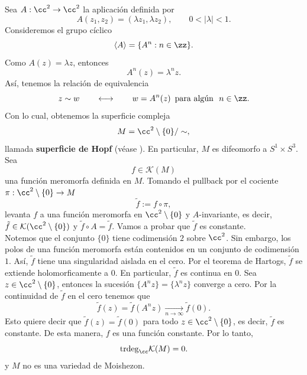 \begin{example}\label{hopfsuperficie}
	Sea $A:\cc^2\to\cc^2$ la aplicación definida por
	\begin{equation*}
		A(z_1,z_2)=(\lambda z_1,\lambda z_2),\qquad 0<|\lambda|<1.
	\end{equation*}
	Consideremos el grupo cíclico
	\begin{equation*}
		\langle A\rangle=\{A^n:n\in\zz\}.
	\end{equation*}
	Como $A(z)=\lambda z$, entonces
	\begin{equation*}
		A^n(z)=\lambda^n z.
	\end{equation*}
	Así, tenemos la relación de equivalencia
	\begin{equation*}
		z\sim w\qquad \longleftrightarrow\qquad w=A^n(z)\enspace \text{para algún }\ n\in\zz.
	\end{equation*}
	Con lo cual, obtenemos la superficie compleja
	\begin{equation*}
		M=\cc^2\setminus\{0\}/\sim,
	\end{equation*}
	llamada \textbf{superficie de Hopf} (véase \parencite[Example 1.19]{leecomplex}). En particular, $M$ es difeomorfo a $S^1\times S^3$. Sea
	\begin{equation*}
		f\in\mathcal{K}(M)
	\end{equation*}
	una función meromorfa definida en $M$. Tomando el pullback por el cociente $\pi:\cc^2\setminus\{0\}\to M$
	\begin{equation*}
		\tilde{f}:=f\circ\pi,
	\end{equation*}
	levanta $f$ a una función meromorfa en $\cc^2\setminus\{0\}$ y $A$-invariante, es decir, $\tilde{f}\in\mathcal{K}(\cc^2\setminus\{0\})$ y $\tilde{f}\circ A=\tilde{f}$. Vamos a probar que $\tilde{f}$ es constante.\\
	Notemos que el conjunto $\{0\}$ tiene codimensión $2$ sobre $\cc^2$. Sin embargo, los polos de una función meromorfa están contenidos en un conjunto de codimensión $1$. Así, $\tilde{f}$ tiene una singularidad aislada en el cero. Por el teorema de Hartogs, $\tilde{f}$ se extiende holomorficamente a $0$. En particular, $\tilde{f}$ es continua en $0$.
	Sea $z\in \cc^2\setminus\{0\}$, entonces la sucesión $\{A^nz\}=\{\lambda^nz\}$ converge a cero. Por la continuidad de $\tilde{f}$ en el cero tenemos que 
	\begin{equation*}
		\tilde{f}(z)=\tilde{f}(A^nz)\underset{n\to\infty}{\longrightarrow}\tilde{f}(0).
	\end{equation*}
	Esto quiere decir que $\tilde{f}(z)=\tilde{f}(0)$ para todo $z\in \cc^2\setminus\{0\}$, es decir, $\tilde{f}$ es constante. De esta manera, $f$ es una función constante. Por lo tanto,
	\begin{equation*}
		\mathrm{trdeg}_\cc\mathcal{K}(M)=0.
	\end{equation*} 
	y $M$ no es una variedad de Moishezon.
\end{example}

